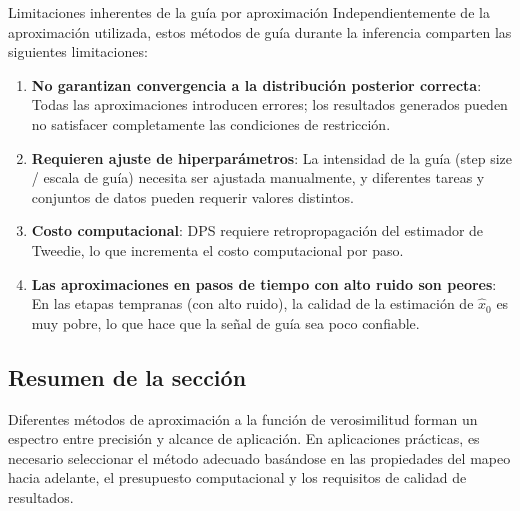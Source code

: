 \begin{warningbox}{Limitaciones inherentes de la guía por aproximación}
Independientemente de la aproximación utilizada, estos métodos de guía durante la inferencia comparten las siguientes limitaciones:
\begin{enumerate}
    \item \textbf{No garantizan convergencia a la distribución posterior correcta}: Todas las aproximaciones introducen errores; los resultados generados pueden no satisfacer completamente las condiciones de restricción.
    \item \textbf{Requieren ajuste de hiperparámetros}: La intensidad de la guía (step size / escala de guía) necesita ser ajustada manualmente, y diferentes tareas y conjuntos de datos pueden requerir valores distintos.
    \item \textbf{Costo computacional}: DPS requiere retropropagación del estimador de Tweedie, lo que incrementa el costo computacional por paso.
    \item \textbf{Las aproximaciones en pasos de tiempo con alto ruido son peores}: En las etapas tempranas (con alto ruido), la calidad de la estimación de $\hat{x}_0$ es muy pobre, lo que hace que la señal de guía sea poco confiable.
\end{enumerate}
\end{warningbox}

\subsection{Resumen de la sección}

Diferentes métodos de aproximación a la función de verosimilitud forman un espectro entre precisión y alcance de aplicación. En aplicaciones prácticas, es necesario seleccionar el método adecuado basándose en las propiedades del mapeo hacia adelante, el presupuesto computacional y los requisitos de calidad de resultados.


